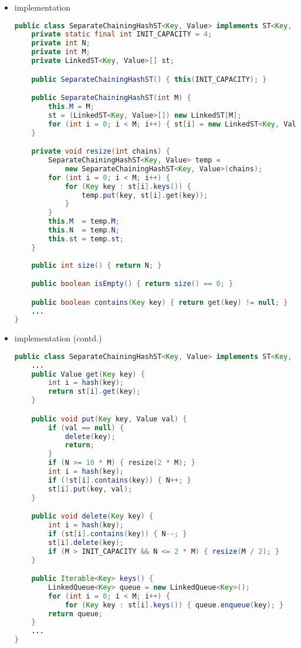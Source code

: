 \documentclass[8pt,a4paper,compress]{beamer}
\begin{document}
\begin{frame}[fragile]
\begin{itemize}
\item implementation
\begin{lstlisting}[language=Java]
public class SeparateChainingHashST<Key, Value> implements ST<Key, Value> {
    private static final int INIT_CAPACITY = 4;
    private int N;
    private int M; 
    private LinkedST<Key, Value>[] st; 

    public SeparateChainingHashST() { this(INIT_CAPACITY); } 

    public SeparateChainingHashST(int M) {
        this.M = M;
        st = (LinkedST<Key, Value>[]) new LinkedST[M];
        for (int i = 0; i < M; i++) { st[i] = new LinkedST<Key, Value>(); }
    } 

    private void resize(int chains) {
        SeparateChainingHashST<Key, Value> temp = 
            new SeparateChainingHashST<Key, Value>(chains);
        for (int i = 0; i < M; i++) {
            for (Key key : st[i].keys()) {
                temp.put(key, st[i].get(key));
            }
        }
        this.M  = temp.M;
        this.N  = temp.N;
        this.st = temp.st;
    }
    
    public int size() { return N; } 

    public boolean isEmpty() { return size() == 0; }

    public boolean contains(Key key) { return get(key) != null; } 
    ...
}
\end{lstlisting}
\end{itemize}
\end{frame}

\begin{frame}[fragile]
\begin{itemize}
\item implementation (contd.)
\begin{lstlisting}[language=Java]
public class SeparateChainingHashST<Key, Value> implements ST<Key, Value> {
    ...
    public Value get(Key key) {
        int i = hash(key);
        return st[i].get(key);
    } 

    public void put(Key key, Value val) {
        if (val == null) {
            delete(key);
            return;
        }
        if (N >= 10 * M) { resize(2 * M); }
        int i = hash(key);
        if (!st[i].contains(key)) { N++; }
        st[i].put(key, val);
    } 

    public void delete(Key key) {
        int i = hash(key);
        if (st[i].contains(key)) { N--; }
        st[i].delete(key);
        if (M > INIT_CAPACITY && N <= 2 * M) { resize(M / 2); }
    } 

    public Iterable<Key> keys() {
        LinkedQueue<Key> queue = new LinkedQueue<Key>();
        for (int i = 0; i < M; i++) {
            for (Key key : st[i].keys()) { queue.enqueue(key); }
        return queue;
    } 
    ...
}
\end{lstlisting}
\end{itemize}
\end{frame}
\end{document}
